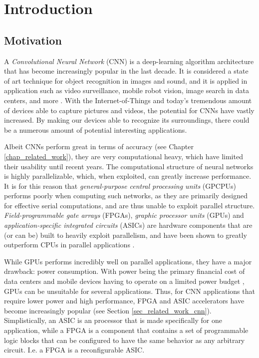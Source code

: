 \chapter{Introduction}

\section{Motivation}

A \textit{Convolutional Neural Network} (CNN) is a deep-learning algorithm architecture that has become increasingly popular in the last decade. It is considered a state of art technique for object recognition in images and sound, and it is applied in application such as video surveillance, mobile robot vision, image search in data centers, and more \cite{Zhang2015} \cite{Farabet2009} \cite{Ji2013} \cite{Ovtcharov2015}. With the Internet-of-Things and today's tremendous amount of devices able to capture pictures and videos, the potential for CNNs have vastly increased. By making our devices able to recognize its surroundings, there could be a numerous amount of potential interesting applications.

Albeit CNNs perform great in terms of accuracy (see Chapter \ref{chap_related_work}), they are very computational heavy, which have limited their usability until recent years. The computational structure of neural networks is highly parallelizable, which, when exploited, can greatly increase performance. It is for this reason that \textit{general-purpose central processing units} (GPCPUs) performs poorly when computing such networks, as they are primarily designed for effective serial computations, and are thus unable to exploit parallel structure. \textit{Field-programmable gate arrays} (FPGAs), \textit{graphic processor units} (GPUs) and \textit{application-specific integrated circuits} (ASICs) are hardware components that are (or can be) built to heavily exploit parallelism, and have been shown to greatly outperform CPUs in parallel applications \cite{Chung2010}.

While GPUs performs incredibly well on parallel applications, they have a major drawback: power consumption. With power being the primary financial cost of data centers and mobile devices having to operate on a limited power budget \cite{Duranton2013}, GPUs can be unsuitable for several applications. Thus, for CNN applications that require lower power and high performance, FPGA and ASIC accelerators have become increasingly popular (see Section \ref{sec_related_work_cnn}). Simplistically, an ASIC is an processor that is made specifically for one application,  while a FPGA is a component that contains a set of programmable logic blocks that can be configured to have the same behavior as any arbitrary circuit. I.e. a FPGA is a reconfigurable ASIC. 

